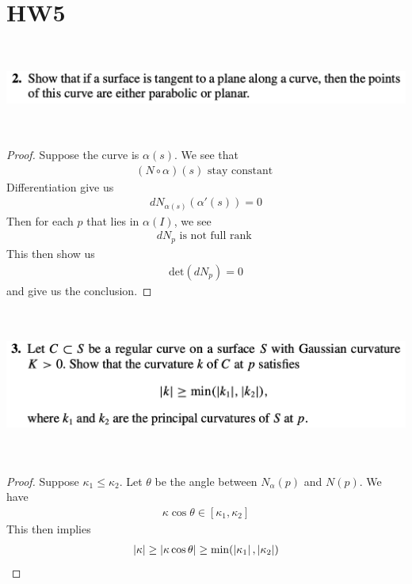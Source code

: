 \documentclass{report}
\begin{document}
\section{HW5}
\begin{question}{}{}
\includegraphics[height=3cm,width=18cm]{hw5q1}
\end{question}
\begin{proof}
Suppose the curve is $\alpha (s)$. We see that 
\begin{align*}
  (N\circ \alpha)(s)\text{ stay constant } 
\end{align*}
Differentiation give us 
\begin{align*}
dN_{\alpha (s)}(\alpha '(s))=0
\end{align*}
Then for each $p$ that lies in $\alpha (I)$, we see 
\begin{align*}
dN_p\text{ is not full rank }
\end{align*}
This then show us 
\begin{align*}
\text{det}(dN_p)=0
\end{align*}
and give us the conclusion.
\end{proof}
\begin{question}{}{}
\includegraphics[height=5cm,width=18cm]{hw5q2}
\end{question}
\begin{proof}
Suppose $\kappa_1\leq \kappa_2$. Let $\theta$ be the angle between $N_\alpha (p)$ and $N(p)$. We have 
\begin{align*}
\kappa \cos \theta \in [\kappa_1,\kappa_2]
\end{align*}
This then implies 
\begin{align*}
\left|\kappa\right|\geq \left|\kappa \cos \theta\right|\geq \min (\left|\kappa_1\right|,\left|\kappa_2\right|)
\end{align*}
\end{proof}
\end{document}
